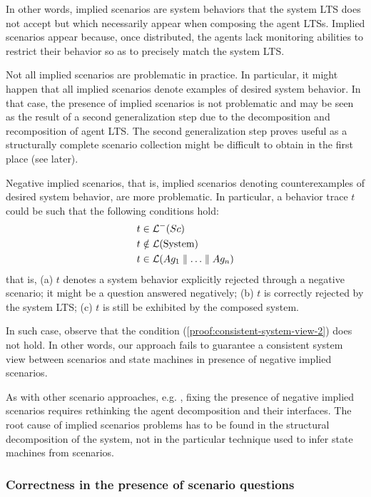 In other words, implied scenarios are system behaviors that the system LTS does not accept but which necessarily appear when composing the agent LTSs. Implied scenarios appear because, once distributed, the agents lack monitoring abilities to restrict their behavior so as to precisely match the system LTS.

Not all implied scenarios are problematic in practice. In particular, it might happen that all implied scenarios denote examples of desired system behavior. In that case, the presence of implied scenarios is not problematic and may be seen as the result of a second generalization step due to the decomposition and recomposition of agent LTS. The second generalization step proves useful as a structurally complete scenario collection might be difficult to obtain in the first place (see later).

Negative implied scenarios, that is, implied scenarios denoting counterexamples of desired system behavior, are more problematic. In particular, a behavior trace $t$ could be such that the following conditions hold:
\begin{align}
&t \in \mathcal{L}^-(Sc)\\
&t \notin \mathcal{L}(\mbox{System})\\
&t \in \mathcal{L}(Ag_1 \parallel \ldots \parallel Ag_n)
\end{align}
that is, (a) $t$ denotes a system behavior explicitly rejected through a negative scenario; it might be a question answered negatively; (b) $t$ is correctly rejected by the system LTS; (c) $t$ is still be exhibited by the composed system.

In such case, observe that the condition (\ref{proof:consistent-system-view-2}) does not hold. In other words, our approach fails to guarantee a consistent system view between scenarios and state machines in presence of negative implied scenarios.

As with other scenario approaches, e.g. \cite{Alur:2000, Uchitel:2004}, fixing the presence of negative implied scenarios requires rethinking the agent decomposition and their interfaces. The root cause of implied scenarios problems has to be found in the structural decomposition of the system, not in the particular technique used to infer state machines from scenarios.

\subsubsection*{Correctness in the presence of scenario questions}

